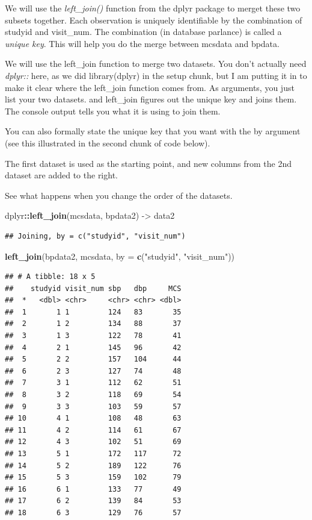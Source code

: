 \documentclass[
]{book}
\newenvironment{Shaded}{\begin{snugshade}}{\end{snugshade}}
\newcommand{\DataTypeTok}[1]{\textcolor[rgb]{0.13,0.29,0.53}{#1}}
\newcommand{\KeywordTok}[1]{\textcolor[rgb]{0.13,0.29,0.53}{\textbf{#1}}}
\newcommand{\NormalTok}[1]{#1}
\newcommand{\OperatorTok}[1]{\textcolor[rgb]{0.81,0.36,0.00}{\textbf{#1}}}
\newcommand{\StringTok}[1]{\textcolor[rgb]{0.31,0.60,0.02}{#1}}
\begin{document}
We will use the \emph{left\_join()} function from the dplyr package to merget these two subsets together. Each observation is uniquely identifiable by the combination of studyid and visit\_num. The combination (in database parlance) is called a \emph{unique key}. This will help you do the merge between mcsdata and bpdata.

We will use the left\_join function to merge two datasets. You don't actually need \emph{dplyr::} here, as we did library(dplyr) in the setup chunk, but I am putting it in to make it clear where the left\_join function comes from. As arguments, you just list your two datasets. and left\_join figures out the unique key and joins them. The console output tells you what it is using to join them.

You can also formally state the unique key that you want with the by argument (see this illustrated in the second chunk of code below).

The first dataset is used as the starting point, and new columns from the 2nd dataset are added to the right.

See what happens when you change the order of the datasets.

\begin{Shaded}
\begin{Highlighting}[]
\NormalTok{dplyr}\OperatorTok{::}\KeywordTok{left_join}\NormalTok{(mcsdata, bpdata2) ->}
\StringTok{  }\NormalTok{data2}
\end{Highlighting}
\end{Shaded}

\begin{verbatim}
## Joining, by = c("studyid", "visit_num")
\end{verbatim}

\begin{Shaded}
\begin{Highlighting}[]
\KeywordTok{left_join}\NormalTok{(bpdata2, mcsdata, }\DataTypeTok{by =} \KeywordTok{c}\NormalTok{(}\StringTok{"studyid"}\NormalTok{, }\StringTok{"visit_num"}\NormalTok{))}
\end{Highlighting}
\end{Shaded}

\begin{verbatim}
## # A tibble: 18 x 5
##    studyid visit_num sbp   dbp     MCS
##  *   <dbl> <chr>     <chr> <chr> <dbl>
##  1       1 1         124   83       35
##  2       1 2         134   88       37
##  3       1 3         122   78       41
##  4       2 1         145   96       42
##  5       2 2         157   104      44
##  6       2 3         127   74       48
##  7       3 1         112   62       51
##  8       3 2         118   69       54
##  9       3 3         103   59       57
## 10       4 1         108   48       63
## 11       4 2         114   61       67
## 12       4 3         102   51       69
## 13       5 1         172   117      72
## 14       5 2         189   122      76
## 15       5 3         159   102      79
## 16       6 1         133   77       49
## 17       6 2         139   84       53
## 18       6 3         129   76       57
\end{verbatim}
\end{document}
